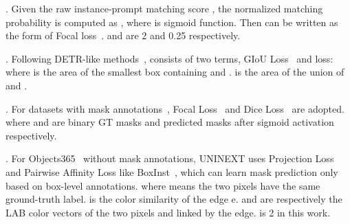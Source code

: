 \documentclass[10pt,twocolumn,letterpaper]{article}
\def\pt{p_\textrm{t}}
\def\at{\alpha_\textrm{t}}
\newcommand{\eqnnm}[2]{\ignorespaces}
\begin{document}
\underline{\bm{}}. Given the raw instance-prompt matching score , the normalized matching probability  is computed as , where  is sigmoid function. Then  can be written as the form of Focal loss~\cite{RetinaNet}.
 \eqnnm{flalpha}{\mathcal{L}_\mathrm{retrieve}(\pt) = - \at (1 - \pt)^\gamma \log (\pt).}
\eqnnm{pt}{\pt=\begin{cases} p &\text{if matched}\\ 1 - p &\text{otherwise.}\end{cases}}
 and  are 2 and 0.25 respectively.

\underline{\bm{}}. Following DETR-like methods~\cite{DETR,DeformableDETR},  consists of two terms, GIoU Loss~\cite{GIoULoss} and  loss:
 \eqnnm{loss_box}{\mathcal{L}_\mathrm{box}(b,\hat{b}) = \lambda_{giou}\mathcal{L}_\mathrm{giou}(b,\hat{b})+\lambda_{L_1}\Vert b-\hat{b} \Vert.}
\eqnnm{loss_giou}{\mathcal{L}_\mathrm{giou}(b,\hat{b})=1-IoU(b,\hat{b})+\frac{A^c(b,\hat{b})-U(b,\hat{b})}{A^c(b,\hat{b})},}
where  is the area of the smallest box containing  and .  is the area of the union of  and .

\underline{\bm{}}. For datasets with mask annotations~\cite{COCO,RefCOCO&plus,YoutubeVOS,VIS,URVOS}, Focal Loss~\cite{RetinaNet} and Dice Loss~\cite{DiceLoss} are adopted. 
\eqnnm{loss_mask}{\mathcal{L}_\mathrm{mask}(m,\hat{m}) = \lambda_{focal}\mathcal{L}_\mathrm{focal}(m,\hat{m})+\lambda_{dice}\mathcal{L}_\mathrm{dice}(m,\hat{m}).}
\eqnnm{loss_dice}{\mathcal{L}_\mathrm{dice}(m,\hat{m})=1-\frac{2m\hat{m}+1}{\hat{m}+m+1},}
where  and  are binary GT masks and predicted masks after sigmoid activation respectively.

\underline{\bm{}}. For Objects365~\cite{Objects365} without mask annotations, UNINEXT uses Projection Loss and Pairwise Affinity Loss like BoxInst~\cite{BoxInst}, which can learn mask prediction only based on box-level annotations.
\eqnnm{loss_boxinst}{\mathcal{L}^\mathrm{boxinst}_\mathrm{mask}(b,\hat{m}) = \mathcal{L}_\mathrm{proj}(b,\hat{m})+\mathcal{L}_\mathrm{pairwise}(b,\hat{m}).}
\eqnnm{loss_proj}{
\begin{split}
\mathcal{L}_\mathrm{proj}(b,\hat{m})=&\mathcal{L}_\mathrm{dice}(\mathrm{proj_x}(b),\mathrm{proj_x}(\hat{m}))+\\
&\mathcal{L}_\mathrm{dice}(\mathrm{proj_y}(b),\mathrm{proj_y}(\hat{m})).
\end{split}
}
\eqnnm{loss_pairwise}{\mathcal{L}_\mathrm{pairwise} = -\frac{1}{N}\sum_{e \in E_{in}}\mathbbm{1}_{\{S_e \geq \tau\}}\log P(y_e = 1).}
\eqnnm{y_e}{
     P(y_e = 1) = \hat{m}_{i, j}
     \cdot
     \hat{m}_{k, l} + (1 - \hat{m}_{i, j})
\cdot
     (1 - \hat{m}_{k, l}).}
\eqnnm{S_e}{S_e = S(c_{i, j}, c_{l, k}) = \exp\left(-\frac{||c_{i, j} - c_{l, k}||}{\theta}\right),}
where  means the two pixels have the same ground-truth label.  is the color similarity of the edge e.  and  are respectively the LAB color vectors of the two pixels  and  linked by the edge.  is 2 in this work.
\end{document}
